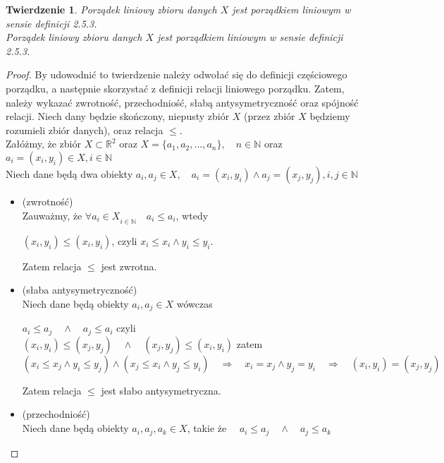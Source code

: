 \documentclass[12pt,a4paper]{report}
\newtheorem{theorem}{Twierdzenie}[section]
\begin{document}
\begin{theorem}{Porządek liniowy zbioru danych $X$ jest porządkiem liniowym w sensie definicji 2.5.3.\\} 
Porządek liniowy zbioru danych $X$ jest porządkiem liniowym w sensie definicji 2.5.3.
\end{theorem}
\begin{proof}
By udowodnić to twierdzenie należy odwołać się do definicji częściowego porządku, a następnie skorzystać z definicji relacji liniowego porządku. Zatem, należy wykazać zwrotność, przechodniość, słabą antysymetryczność oraz spójność relacji. Niech dany będzie skończony, niepusty zbiór $X$ (przez zbiór $X$ będziemy rozumieli zbiór danych), oraz relacja $\leq$.\\
Załóżmy, że zbiór $X \subset \mathbb{R}^2$ oraz $X=\{a_1, a_2,..., a_n\},\quad n\in \mathbb{N}$ oraz $a_i=(x_i,y_i) \in X,  i\in \mathbb{N}$\\
Niech dane będą dwa obiekty $a_i, a_j \in X, \quad a_i=(x_i, y_i)  \wedge a_j=(x_j, y_j),  i, j\in \mathbb{N}$\\
\begin{itemize}%
\item (zwrotność)\\
Zauważmy, że $\forall{a_i \in X}_{i \in \mathbb{N}} \quad a_i \leq a_i$, wtedy
\begin{center}
 $(x_i, y_i) \leq (x_i, y_i)$, czyli $x_i \leq x_i \wedge y_i \leq y_i$. \\
\end{center}
Zatem relacja $\leq$ jest zwrotna.
\item (słaba antysymetryczność)\\
Niech dane będą obiekty $a_i, a_j \in X$ wówczas 
\begin{center}
$a_i \leq a_j \quad \wedge \quad a_j \leq a_i$ czyli\\
$(x_i, y_i) \leq (x_j, y_j) \quad \wedge \quad  (x_j, y_j) \leq (x_i, y_i)$ zatem \\
$(x_i \leq x_j \wedge y_i \leq y_j) \wedge (x_j\leq x_i \wedge y_j \leq y_i)\quad  \Rightarrow \quad x_i=x_j \wedge y_j=y_i \quad \Rightarrow \quad (x_i,y_i)=(x_j,y_j)$
\end{center}
Zatem relacja $\leq$ jest słabo antysymetryczna.
\item (przechodniość)\\
Niech dane będą obiekty $a_i, a_j, a_k \in X$, takie że $\quad a_i \leq a_j \quad  \wedge \quad a_j \leq a_k$
\begin{center}

\end{center}
\end{itemize}
\end{proof}
\end{document}
